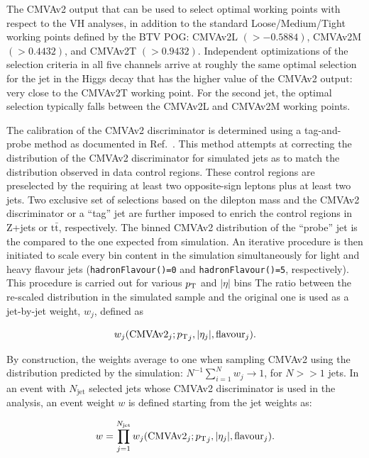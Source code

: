 The CMVAv2 output that can be used to select 
optimal working points with respect to the VH analyses, in addition to the standard 
Loose/Medium/Tight working points defined by the BTV POG: CMVAv2L $(>-0.5884)$, 
CMVAv2M $(>0.4432)$, and CMVAv2T $(>0.9432)$.
Independent optimizations of the selection criteria in all five channels arrive at roughly the same 
optimal selection for the jet in the Higgs decay that has the higher value of the CMVAv2
output: very close to the CMVAv2T working point. For the second jet, the optimal selection 
typically falls between the CMVAv2L and CMVAv2M working points.

The calibration of the CMVAv2 discriminator is determined using a tag-and-probe method
as documented in Ref.~\cite{bTagWeight}.
This method attempts at correcting the distribution of the CMVAv2 discriminator for simulated jets
as to match the distribution observed in data control regions.
These control regions are preselected by the requiring at least two opposite-sign leptons
plus at least two jets. Two exclusive set of selections based on the dilepton mass and the CMVAv2 discriminator or
a ``tag'' jet are further imposed to enrich the control regions in Z+jets or $\mathrm{t\bar{t}}$, respectively.
The binned CMVAv2 distribution of the ``probe'' jet is the compared to the one expected from simulation. An iterative
procedure is then initiated to scale every bin content in the simulation simultaneously for light and heavy flavour jets
(\texttt{hadronFlavour()=0} and \texttt{hadronFlavour()=5}, respectively). This procedure is carried out for various
$p_{\mathrm{T}}$ and $|\eta|$ bins 
The ratio between the re-scaled distribution in the simulated sample and the original one is used as a jet-by-jet 
weight, $w_j$, defined as
\begin{linenomath}\begin{equation}
w_j(\mathrm{CMVAv2}_j;{p_{\mathrm{T}}}_j,|\eta_j|,\mathrm{flavour}_j).
\end{equation}\end{linenomath}
By construction, the weights average to one when sampling CMVAv2 using the distribution predicted by the
simulation: $N^{-1}\sum_{i=1}^{N} w_j \to 1$, for $N>>1$ jets. 
In an event with $N_{\mathrm{jet}}$ selected jets whose CMVAv2 discriminator is used in the analysis,     
an event weight $w$ is defined starting from the jet weights as:
\begin{linenomath}\begin{equation}
w = \prod_{j=1}^{N_{\mathrm{jet}}} w_j(\mathrm{CMVAv2}_j;{p_{\mathrm{T}}}_j,|\eta_j|,\mathrm{flavour}_j).
\end{equation}\end{linenomath}

